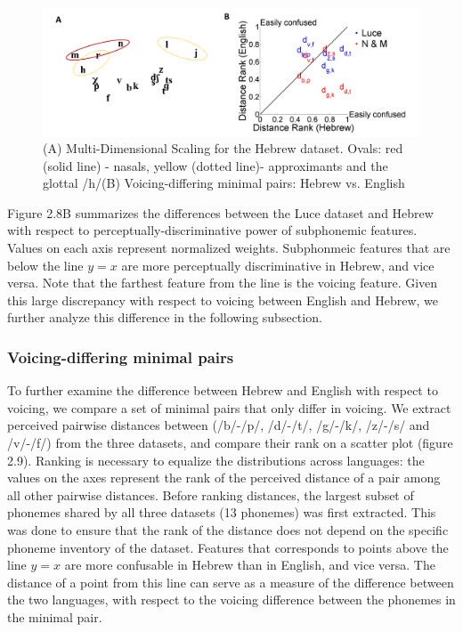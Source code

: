 \begin{figure}[H]
\vspace{.3in}
\includegraphics[width=\linewidth]{Figures/Ch2/Slide5.PNG}
\caption{(A) Multi-Dimensional Scaling for the Hebrew dataset. Ovals: red (solid line) - nasals, yellow (dotted line)- approximants and the glottal /h/(B) Voicing-differing minimal pairs: Hebrew vs. English}
\end{figure}

Figure 2.8B summarizes the differences between the Luce dataset and Hebrew with respect to perceptually-discriminative power of subphonemic features. Values on each axis represent normalized weights. Subphonmeic features that are below the line $y = x$ are more perceptually discriminative in Hebrew, and vice versa. Note that the farthest feature from the line is the voicing feature. Given this large discrepancy with respect to voicing between English and Hebrew, we further analyze this difference in the following subsection.

\subsubsection{Voicing-differing minimal pairs} To further examine the difference between Hebrew and English with respect to voicing, we compare a set of minimal pairs that only differ in voicing. We extract perceived pairwise distances between (/b/-/p/, /d/-/t/, /g/-/k/, /z/-/s/ and /v/-/f/) from the three datasets, and compare their rank on a scatter plot (figure 2.9). Ranking is necessary to equalize the distributions across languages: the values on the axes represent the rank of the perceived distance of a pair among all other pairwise distances. Before ranking distances, the largest subset of phonemes shared by all three datasets (13 phonemes) was first extracted. This was done to ensure that the rank of the distance does not depend on the specific phoneme inventory of the dataset. Features that corresponds to points above the line $y=x$ are more confusable in Hebrew than in English, and vice versa. The distance of a point from this line can serve as a measure of the difference between the two languages, with respect to the voicing difference between the phonemes in the minimal pair.

